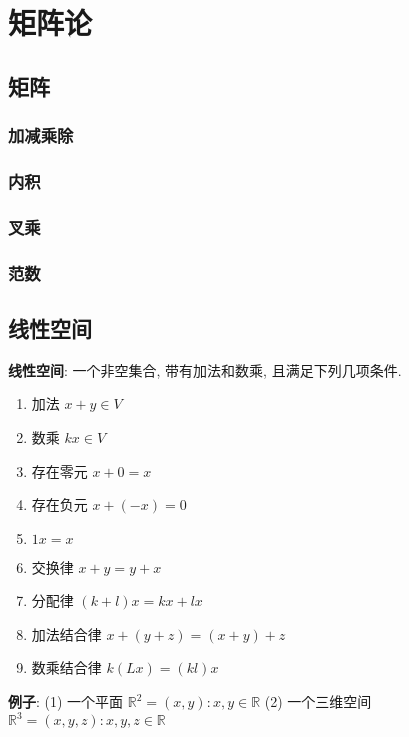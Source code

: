 \documentclass{article}
\title{}\date{} \setlength{\parindent}{0pt} \linespread{1.25}
\begin{document}
\tableofcontents

\section{矩阵论}
    \subsection{矩阵}
        \subsubsection{加减乘除}

        \subsubsection{内积}

        \subsubsection{叉乘}

        \subsubsection{范数}


    \subsection{线性空间}
        \textbf{线性空间}: 一个非空集合, 带有加法和数乘, 且满足下列几项条件.
            \begin{enumerate}
                \item 加法   $x+y \in V$
                \item 数乘   $k x \in V$
                \item 存在零元 $x+0=x$
                \item 存在负元 $x+(-x) = 0$
                \item $1x = x$
                \item 交换律 $x+y = y+x$
                \item 分配律 $(k+l)x = kx+lx$
                \item 加法结合律 $x+(y+z) = (x+y) +z$
                \item 数乘结合律 $k(Lx) = (kl)x$
            \end{enumerate}
            
            \textbf{例子}:
                (1) 一个平面 $\mathbb R^2 = {(x,y): x, y\in \mathbb R}$
                (2) 一个三维空间 $\mathbb R^3 = {(x,y,z): x, y, z\in \mathbb R}$
\end{document}
